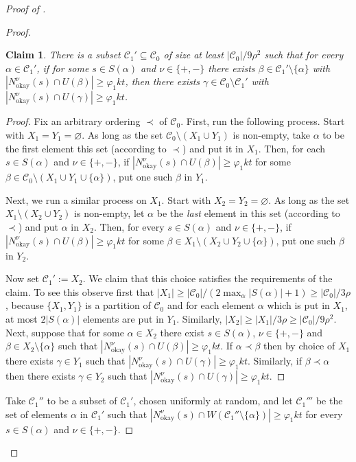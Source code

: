 \documentclass[english]{article}
\theoremstyle{plain}
\newtheorem{claim}[theorem]{Claim}
\theoremstyle{remark}
\def\C{\mathcal{C}}
\let\phi\varphi
\def \Nnuo{N^{\nu}_{\okay}}
\let\emptyset\varnothing
\DeclareMathOperator{\okay}{okay}
\begin{document}
\begin{proof}[Proof of ]
\begin{proof}
				\begin{claim} \label{claim:available-one}
					There is a subset $\C_1' \subseteq \C_0$ of size at least $|\C_0|/9\rho^2$ such that for every $\alpha \in \C_1'$, if for some $s \in S(\alpha)$ and $\nu \in \{+, -\}$ there exists $\beta \in \C_1' \setminus \{\alpha\}$ with $|\Nnuo(s) \cap U(\beta)| \ge \phi_1 kt$, then there exists $\gamma \in \C_0 \setminus \C_1'$ with $|\Nnuo(s) \cap U(\gamma)| \ge \phi_1 kt$.
				\end{claim}

				\begin{proof}
					Fix an arbitrary ordering $\prec$ of $\C_0$. 
					First, run the following process. Start with $X_1 = Y_1 = \emptyset$. As long as the set $\C_0 \setminus (X_1 \cup Y_1)$ is non-empty, take $\alpha$ to be the first element this set (according to $\prec$) and put it in $X_1$. Then, for each $s \in S(\alpha)$ and $\nu \in \{+, -\}$, if $|\Nnuo(s) \cap U(\beta)| \ge \phi_1 kt$ for some $\beta \in \C_0 \setminus (X_1 \cup Y_1 \cup \{\alpha\})$, put one such $\beta$ in $Y_1$.

					Next, we run a similar process on $X_1$. Start with $X_2 = Y_2 = \emptyset$. As long as the set $X_1 \setminus (X_2 \cup Y_2)$ is non-empty, let $\alpha$ be the \emph{last} element in this set (according to $\prec$) and put $\alpha$ in $X_2$. Then, for every $s \in S(\alpha)$ and $\nu \in \{+, -\}$, if $|\Nnuo(s) \cap U(\beta)| \ge \phi_1 kt$ for some $\beta \in X_1 \setminus (X_2 \cup Y_2 \cup \{\alpha\})$, put one such $\beta$ in $Y_2$.

					Now set $\C_1' := X_2$. We claim that this choice satisfies the requirements of the claim.
					To see this observe first that $|X_1| \ge |\C_0|/(2\max_{\alpha} |S(\alpha)| + 1) \ge |\C_0|/3\rho$, because $\{X_1, Y_1\}$ is a partition of $\C_0$ and for each element $\alpha$ which is put in $X_1$, at most $2|S(\alpha)|$ elements are put in $Y_1$. Similarly, $|X_2| \ge |X_1| / 3\rho \ge |\C_0|/9\rho^2$. 
					Next, suppose that for some $\alpha \in X_2$ there exist $s \in S(\alpha)$, $\nu \in \{+, -\}$ and $\beta \in X_2 \setminus \{\alpha\}$ such that $|\Nnuo(s) \cap U(\beta)| \ge \phi_1 kt$. If $\alpha \prec \beta$ then by choice of $X_1$ there exists $\gamma \in Y_1$ such that $|\Nnuo(s) \cap U(\gamma)| \ge \phi_1 kt$. Similarly, if $\beta \prec \alpha$ then there exists $\gamma \in Y_2$ such that $|\Nnuo(s) \cap U(\gamma)| \ge \phi_1 kt$.
				\end{proof}

				Take $\C_1''$ to be a subset of $\C_1'$, chosen uniformly at random, and let $\C_1'''$ be the set of elements $\alpha$ in $\C_1'$ such that $|\Nnuo(s) \cap W(\C_1'' \setminus \{\alpha\})| \ge \phi_1 kt$ for every $s \in S(\alpha)$ and $\nu \in \{+, -\}$.


\end{proof}
\end{proof}
\end{document}
